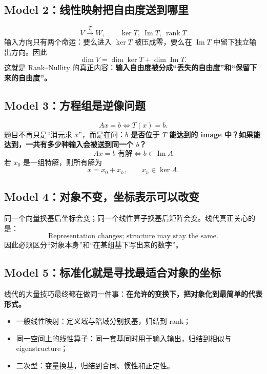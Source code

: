 \documentclass[11pt,a4paper,openany]{ctexbook}
\newcommand{\key}[1]{\textbf{\color{deep}#1}}
\begin{document}
\subsection{Model 2：线性映射把自由度送到哪里}
\[
\boxed{V\xrightarrow{T}W,\qquad \ker T,\ \operatorname{Im}T,\ \operatorname{rank}T}
\]
输入方向只有两个命运：要么进入 $\ker T$ 被压成零，要么在 $\operatorname{Im}T$ 中留下独立输出方向。因此
\[
\boxed{\dim V=\dim\ker T+\dim\operatorname{Im}T}.
\]
这就是 Rank--Nullity 的真正内容：\key{输入自由度被分成“丢失的自由度”和“保留下来的自由度”。}

\subsection{Model 3：方程组是逆像问题}
\[
Ax=b\iff T(x)=b.
\]
题目不再只是“消元求 $x$”，而是在问：\key{$b$ 是否位于 $T$ 能达到的 image 中？如果能达到，一共有多少种输入会被送到同一个 $b$？}
\[
\boxed{Ax=b\text{ 有解}\iff b\in\operatorname{Im}A}
\]
若 $x_0$ 是一组特解，则所有解为
\[
\boxed{x=x_0+x_h,\qquad x_h\in\ker A}.
\]

\subsection{Model 4：对象不变，坐标表示可以改变}
同一个向量换基后坐标会变；同一个线性算子换基后矩阵会变。线代真正关心的是：
\[
\boxed{\text{Representation changes; structure may stay the same.}}
\]
因此必须区分“对象本身”和“在某组基下写出来的数字”。

\subsection{Model 5：标准化就是寻找最适合对象的坐标}
线代的大量技巧最终都在做同一件事：\key{在允许的变换下，把对象化到最简单的代表形式。}
\begin{itemize}
  \item 一般线性映射：定义域与陪域分别换基，归结到 rank；
  \item 同一空间上的线性算子：同一套基同时用于输入输出，归结到相似与 eigenstructure；
  \item 二次型：变量换基，归结到合同、惯性和正定性。
\end{itemize}
\end{document}
